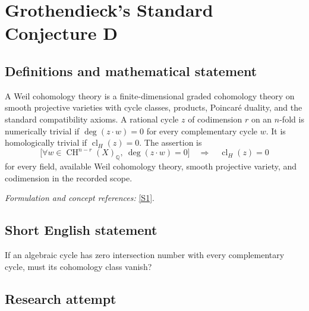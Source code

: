 \documentclass[11pt,a4paper]{article}
\newcommand{\Q}{\mathbb{Q}}
\newcommand{\sref}[2]{\hyperlink{source:#1:#2}{[S#2]}}
\newif\ifshowcatalogue
\newcommand{\cataloguescope}[1]{\ifshowcatalogue
 \paragraph{Exact scope in the supplied catalogue.}
 \begin{quote}\small #1\end{quote}\fi}
\numberwithin{equation}{section}
\begin{document}
\setcounter{section}{43}
\clearpage
\section{\texorpdfstring{Grothendieck's Standard Conjecture D}{Grothendieck's Standard Conjecture D}}\label{44}
\subsection{Definitions and mathematical statement}
A Weil cohomology theory is a finite-dimensional graded cohomology theory on smooth projective varieties with cycle classes, products, Poincaré duality, and the standard compatibility axioms. A rational cycle $z$ of codimension $r$ on an $n$-fold is numerically trivial if $\deg(z\cdot w)=0$ for every complementary cycle $w$. It is homologically trivial if $\operatorname{cl}_H(z)=0$. The assertion is
\[
 \bigl[\forall w\in\operatorname{CH}^{n-r}(X)_{\Q},\ \deg(z\cdot w)=0\bigr]
 \quad\Longrightarrow\quad \operatorname{cl}_H(z)=0
\]
for every field, available Weil cohomology theory, smooth projective variety, and codimension in the recorded scope.
\par\smallskip\textit{Formulation and concept references:} \sref{44}{1}.
\cataloguescope{For every field k, every Weil cohomology theory H* available over k, every smooth projective k-variety X of pure dimension n, every integer r with 0<=r<=n, and every rational algebraic cycle z of codimension r on X, if deg(z.w)=0 for every rational algebraic cycle w of codimension n-r on X, then the H* cycle class of z is zero. Equivalently, numerical and H*-homological equivalence of rational algebraic cycles agree in every codimension.}
\subsection{Short English statement}
If an algebraic cycle has zero intersection number with every complementary cycle, must its cohomology class vanish?
\subsection{Research attempt}
\end{document}
